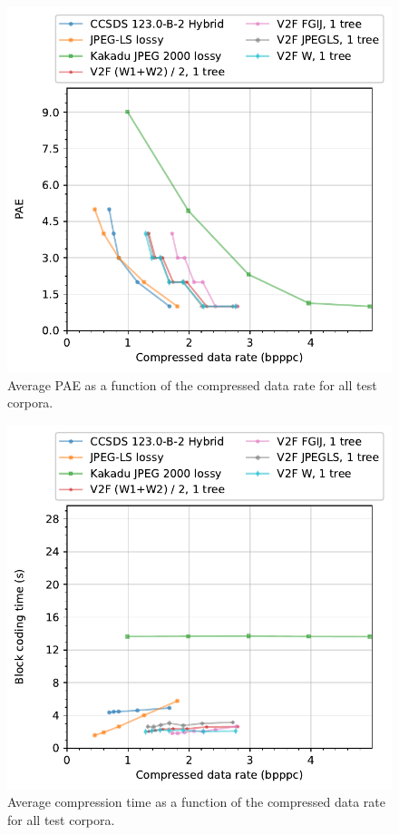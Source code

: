 \documentclass{class/technicalReportUAB}
\begin{document}
\begin{figure}[h]
\begin{center}
\includegraphics[width=0.6\linewidth]{./plots/lossy/TwoNumericAnalyzer-columns_bpppc__pae-line-groupby__family_label.pdf}
\end{center}
\caption{Average PAE as a function of the compressed data rate for all test corpora.}
\label{fig:lossy_pae}
\end{figure}

\begin{figure}[h]
\begin{center}
\includegraphics[width=0.6\linewidth]{./plots/lossy/TwoNumericAnalyzer-columns_bpppc__block_coding_time_seconds-line-groupby__family_label.pdf}
\end{center}
\caption{Average compression time as a function of the compressed data rate for all test corpora.}
\label{fig:lossy_time}
\end{figure}
\end{document}
